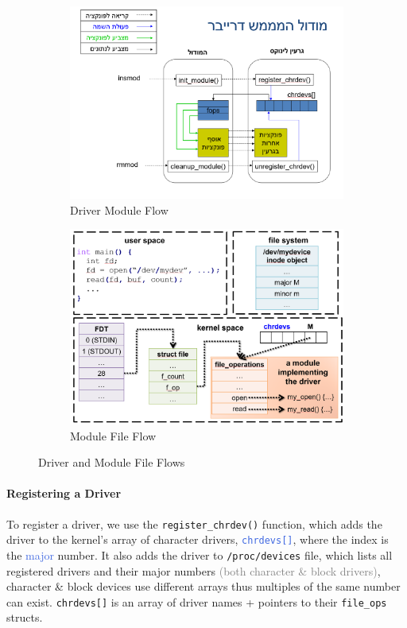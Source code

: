 \documentclass[openany,12pt]{book}
\newcommand{\code}[1]{\texttt{#1}}
\newcommand{\blue}[1]{\textcolor{RoyalBlue}{#1}}
\newcommand{\gray}[1]{\textcolor{gray}{#1}}
\begin{document}
\begin{figure}[H]
  \centering
  \begin{subfigure}[b]{0.48\textwidth}
    \centering
    \includegraphics[width=\textwidth]{module_driver.png}
    \caption{Driver Module Flow}
    \label{fig:driver_module_flow}
  \end{subfigure}
  \hfill
  \begin{subfigure}[b]{0.48\textwidth}
    \centering
    \includegraphics[width=\textwidth]{module_file.png}
    \caption{Module File Flow}
    \label{fig:module_file_flow}
  \end{subfigure}
  \caption{Driver and Module File Flows}
\end{figure}


\paragraph{Registering a Driver} 
To register a driver, we use the \code{register\_chrdev()} function, which adds the driver to the kernel's array of character drivers, \blue{\code{chrdevs[]}}, where the index is the \blue{major} number. It also adds the driver to \code{/proc/devices} file, which lists all registered drivers and their major numbers \gray{(both character \& block drivers)}, character \& block devices use different arrays thus multiples of the same number can exist. \code{chrdevs[]} is an array of driver names + pointers to their \code{file\_ops} structs.
\end{document}
